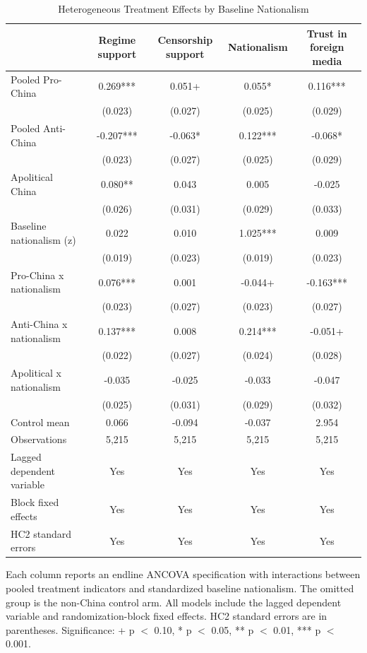 \begin{table}[H]
\centering
\caption{Heterogeneous Treatment Effects by Baseline Nationalism}
\label{tab:het_nat_t1}
\footnotesize
\begin{threeparttable}
\begin{tabular}{lcccc}
\toprule
 & Regime support & Censorship support & Nationalism & Trust in foreign media \\
\midrule
Pooled Pro-China & 0.269*** & 0.051+ & 0.055* & 0.116*** \\
 & (0.023) & (0.027) & (0.025) & (0.029) \\
\addlinespace
Pooled Anti-China & -0.207*** & -0.063* & 0.122*** & -0.068* \\
 & (0.023) & (0.027) & (0.025) & (0.029) \\
\addlinespace
Apolitical China & 0.080** & 0.043 & 0.005 & -0.025 \\
 & (0.026) & (0.031) & (0.029) & (0.033) \\
\addlinespace
Baseline nationalism (z) & 0.022 & 0.010 & 1.025*** & 0.009 \\
 & (0.019) & (0.023) & (0.019) & (0.023) \\
\addlinespace
Pro-China x nationalism & 0.076*** & 0.001 & -0.044+ & -0.163*** \\
 & (0.023) & (0.027) & (0.023) & (0.027) \\
\addlinespace
Anti-China x nationalism & 0.137*** & 0.008 & 0.214*** & -0.051+ \\
 & (0.022) & (0.027) & (0.024) & (0.028) \\
\addlinespace
Apolitical x nationalism & -0.035 & -0.025 & -0.033 & -0.047 \\
 & (0.025) & (0.031) & (0.029) & (0.032) \\
\addlinespace
\midrule
Control mean & 0.066 & -0.094 & -0.037 & 2.954 \\
Observations & 5,215 & 5,215 & 5,215 & 5,215 \\
Lagged dependent variable & Yes & Yes & Yes & Yes \\
Block fixed effects & Yes & Yes & Yes & Yes \\
HC2 standard errors & Yes & Yes & Yes & Yes \\
\bottomrule
\end{tabular}
\begin{tablenotes}[flushleft]
\footnotesize
\item Each column reports an endline ANCOVA specification with interactions between pooled treatment indicators and standardized baseline nationalism. The omitted group is the non-China control arm. All models include the lagged dependent variable and randomization-block fixed effects. HC2 standard errors are in parentheses. Significance: + p $<$ 0.10, * p $<$ 0.05, ** p $<$ 0.01, *** p $<$ 0.001.
\end{tablenotes}
\end{threeparttable}
\end{table}
